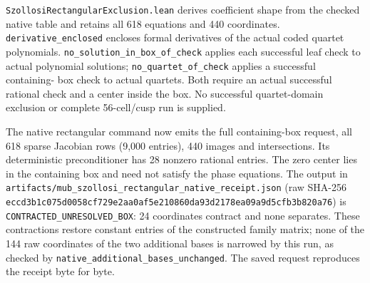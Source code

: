 \documentclass[
]{article}
\begin{document}
\nolinkurl{SzollosiRectangularExclusion.lean} derives coefficient shape
from the checked native table and retains all 618 equations and 440
coordinates. \nolinkurl{derivative_enclosed} encloses formal derivatives
of the actual coded quartet polynomials.
\nolinkurl{no_solution_in_box_of_check} applies each successful leaf
check to actual polynomial solutions; \nolinkurl{no_quartet_of_check}
applies a successful containing- box check to actual quartets. Both
require an actual successful rational check and a center inside the box.
No successful quartet-domain exclusion or complete 56-cell/cusp run is
supplied.

The native rectangular command now emits the full containing-box
request, all 618 sparse Jacobian rows (9,000 entries), 440 images and
intersections. Its deterministic preconditioner has 28 nonzero rational
entries. The zero center lies in the containing box and need not satisfy
the phase equations. The output in
\nolinkurl{artifacts/mub_szollosi_rectangular_native_receipt.json} (raw
SHA-256
\nolinkurl{eccd3b1c075d0058cf729e2aa0af5e210860da93d2178ea09a9d5cfb3b820a76})
is \nolinkurl{CONTRACTED_UNRESOLVED_BOX}: 24 coordinates contract and
none separates. These contractions restore constant entries of the
constructed family matrix; none of the 144 raw coordinates of the two
additional bases is narrowed by this run, as checked by
\nolinkurl{native_additional_bases_unchanged}. The saved request
reproduces the receipt byte for byte.
\end{document}
